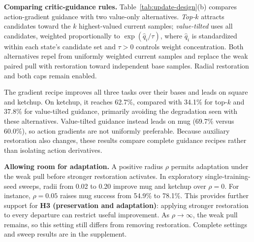 


\textbf{Comparing critic-guidance rules.}
Table~\ref{tab:update-design}(b) compares action-gradient guidance with two value-only alternatives. \emph{Top-$k$} attracts candidates toward the $k$ highest-valued current samples; \emph{value-tilted} uses all candidates, weighted proportionally to $\exp(\hat q_i/\tau)$, where $\hat q_i$ is standardized within each state's candidate set and $\tau>0$ controls weight concentration. Both alternatives repel from uniformly weighted current samples and replace the weak paired pull with restoration toward independent base samples. Radial restoration and both caps remain enabled.

The gradient recipe improves all three tasks over their bases and leads on square and ketchup. On ketchup, it reaches 62.7\%, compared with 34.1\% for top-$k$ and 37.8\% for value-tilted guidance, primarily avoiding the degradation seen with these alternatives. Value-tilted guidance instead leads on mug (69.7\% versus 60.0\%), so action gradients are not uniformly preferable. Because auxiliary restoration also changes, these results compare complete guidance recipes rather than isolating action derivatives.

\textbf{Allowing room for adaptation.}
A positive radius $\rho$ permits adaptation under the weak pull before stronger restoration activates. In exploratory single-training-seed sweeps, radii from 0.02 to 0.20 improve mug and ketchup over $\rho=0$. For instance, $\rho=0.05$ raises mug success from 54.9\% to 78.1\%. This provides further support for \textbf{H3  (preservation and adaptation)}: applying stronger restoration to every departure can restrict useful improvement. As $\rho\to\infty$, the weak pull remains, so this setting still differs from removing restoration. Complete settings and sweep results are in the supplement.





